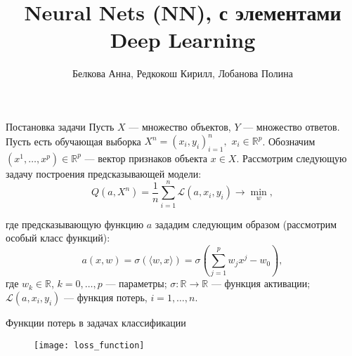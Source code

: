 \documentclass[11pt]{beamer}
\begin{document}
	\title[Neural Nets]{Neural Nets (NN), с элементами Deep Learning}
	\author{Белкова Анна, Редкокош Кирилл, Лобанова Полина}
	
	
	\begin{frame}
		\titlepage 
	\end{frame}

	\begin{frame}{Постановка задачи}
		Пусть $X$ --- множество объектов, $Y$ --- множество ответов. Пусть есть обучающая выборка $X^n = (x_i, y_i)_{i=1}^{n},$ $x_i \in \mathbb{R}^p$. Обозначим $(x^1,\ldots,x^p)\in \mathbb{R}^p$ --- вектор признаков объекта $x\in X$. Рассмотрим следующую задачу построения предсказывающей модели:
		\begin{equation*}
			Q(a, X^n) = \frac{1}{n} \sum_{i=1}^{n} \mathcal{L}(a,x_i,y_i) \rightarrow \min_w,
		\end{equation*}
	
	\pause
	
	где предсказывающую функцию $a$ зададим следующим образом (рассмотрим особый класс функций):
	\begin{equation*}
		a(x, w) = \sigma( \langle w,x \rangle ) = \sigma\left(\sum_{j=1}^{p} w_j x^j - w_0 \right),
	\end{equation*}
	где $w_k \in \mathbb{R}$, $k=0,\ldots,p$ --- параметры; 
	$\sigma: \mathbb{R} \rightarrow  \mathbb{R} $ --- функция активации;
	$\mathcal{L}(a,x_i,y_i)$ --- функция потерь, $i=1,\ldots,n$.
	\end{frame}

	\begin{frame}{Функции потерь в задачах классификации}
		\begin{figure}[hhh!]
			\begin{center}
				\texttt{[image: loss\_function]}
			\end{center}
			\vspace{-5mm}
		\end{figure}
	\end{frame}
\end{document}

